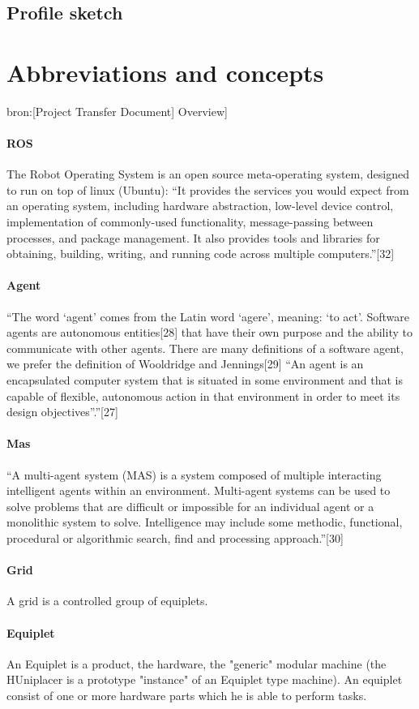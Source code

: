 \documentclass[12pt,a4paper]{report}
\begin{document}
\newpage
\section{Profile sketch}

\chapter{Abbreviations and concepts}
bron:[Project Transfer Document] Overview]
\subsubsection{ROS}
The Robot Operating System is an open source meta-operating system, designed to run on top of linux (Ubuntu): “It provides the services you would expect from an operating system, including hardware abstraction, low-level device control, implementation of commonly-used functionality, message-passing between processes, and package management. It also provides tools and libraries for obtaining, building, writing, and running code across multiple computers.”[32]
\subsubsection{Agent}
“The word ‘agent’ comes from the Latin word ‘agere’, meaning: ‘to act’. Software agents are autonomous entities[28] that have their own purpose and the ability to communicate with other agents. There are many definitions of a software agent, we prefer the definition of Wooldridge and Jennings[29] “An agent is an encapsulated computer system that is situated in some environment and that is capable of flexible, autonomous action in that environment in
order to meet its design objectives”.”[27]
\subsubsection{Mas}
“A multi-agent system (MAS) is a system composed of multiple interacting intelligent agents within an environment. Multi-agent systems can be used to solve problems that are difficult or impossible for an individual agent or a monolithic system to solve. Intelligence may include some methodic, functional, procedural or algorithmic search, find and processing approach.”[30]
\subsubsection{Grid}
A grid is a controlled group of equiplets.
\subsubsection{Equiplet}
An Equiplet is a product, the hardware, the "generic" modular machine (the HUniplacer is a prototype "instance" of an Equiplet type machine). An equiplet consist of one or more hardware parts which he is able to perform tasks.
\end{document}

